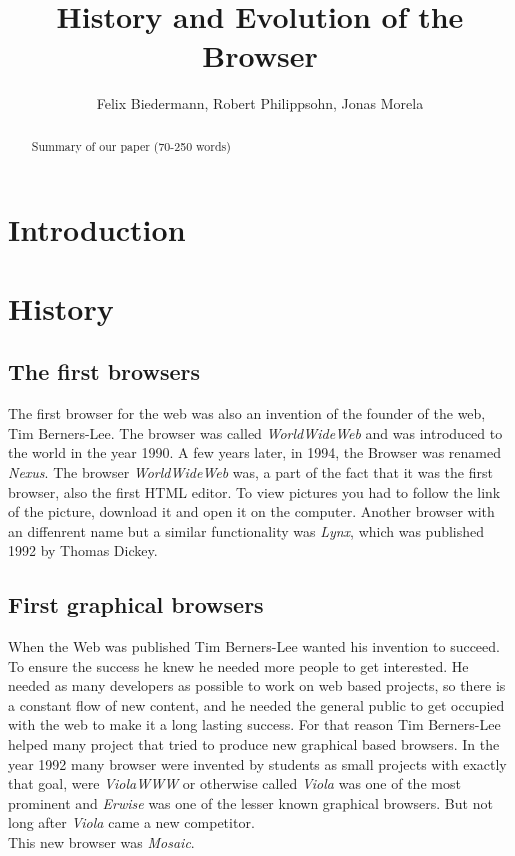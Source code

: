 \documentclass[runningheads]{llncs}
\title{History and Evolution of the Browser}
\author{Felix Biedermann, Robert Philippsohn, Jonas Morela}
\institute{University of Stuttgart, Institute for Architecture of Application Systems \\
Universitätsstraße 38, 70569 Stuttgart, Germany}
\begin{document}
\maketitle

\begin{abstract}
	Summary of our paper (70-250 words)
\end{abstract}

\clearpage
\section{Introduction}

\section{History}
\subsection{The first browsers}
The first browser for the web was also an invention of the founder of the web, Tim Berners-Lee. The browser was called \textit{WorldWideWeb} and was introduced to the world in the year 1990. A few years later, in 1994, the Browser was renamed \textit{Nexus}. The browser \textit{WorldWideWeb} was, a part of the fact that it was the first browser, also the first HTML editor.
To view pictures you had to follow the link of the picture, download it and open it on the computer. Another browser with an diffenrent name but a similar functionality was \textit{Lynx}, which was published 1992 by Thomas Dickey.
\subsection{First graphical browsers}
When the Web was published Tim Berners-Lee wanted his invention to succeed. To ensure the success he knew he needed more people to get interested. He needed as many developers as possible to work on web based projects, so there is a constant flow of new content, and he needed the general public to get occupied with the web to make it a long lasting success. For that reason Tim Berners-Lee helped many project that tried to produce new graphical based browsers. In the year 1992 many browser were invented by students as small projects with exactly that goal, were \textit{ViolaWWW} or otherwise called \textit{Viola} was one of the most prominent and \textit{Erwise} was one of the lesser known graphical browsers. But not long after \textit{Viola} came a new competitor. \\This new browser was \textit{Mosaic}.
\end{document}
